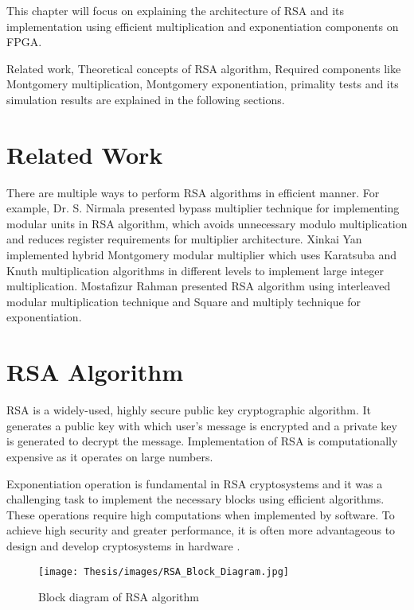 \documentclass{cpp}
\begin{document}
This chapter will focus on explaining the architecture of RSA and its implementation using efficient multiplication and exponentiation components on FPGA.

Related work, Theoretical concepts of RSA algorithm, Required components like Montgomery multiplication, Montgomery exponentiation, primality tests and its simulation results are explained in the following sections.

\section{Related Work}

There are multiple ways to perform RSA algorithms in efficient manner. For example, Dr. S. Nirmala \cite{nirmala:praveena} presented bypass multiplier technique for implementing modular units in RSA algorithm, which avoids unnecessary modulo multiplication and reduces register requirements for multiplier architecture.
Xinkai Yan \cite{yan:wu:zheng:xie} implemented hybrid Montgomery modular multiplier which uses Karatsuba and Knuth multiplication algorithms in different levels to implement large integer multiplication. Mostafizur Rahman \cite{rahman:rokon} presented RSA algorithm using interleaved modular multiplication technique and Square and multiply technique for exponentiation.

%
\section{RSA Algorithm}
%
RSA is a widely-used, highly secure public key cryptographic algorithm. It generates a public key with which user’s message is encrypted and a private key is generated to decrypt the message. Implementation of RSA is computationally expensive as it operates on large numbers.

Exponentiation operation is fundamental in RSA cryptosystems and it was a challenging task to implement the necessary blocks using efficient algorithms. These operations require high computations when implemented by software. To achieve high security and greater performance, it is often more advantageous to design and develop cryptosystems in hardware \cite{mario:guillermo:francisco}.

\begin{figure*}[htp]
    \centering
    \texttt{[image: Thesis/images/RSA\_Block\_Diagram.jpg]}
    \caption{Block diagram of RSA algorithm}
    \label{fig:figure1}
\end{figure*}
\end{document}
